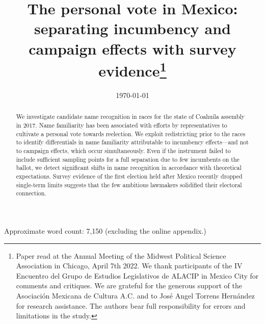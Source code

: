 \documentclass[letter,12pt]{article}
\begin{document}
\title{The personal vote in Mexico: separating incumbency and campaign effects with survey evidence\thanks{Paper read at the Annual Meeting of the Midwest Political Science Association in Chicago, April 7th 2022. We thank participants of the IV Encuentro del Grupo de Estudios Legislativos de ALACIP in Mexico City for comments and critiques. We are grateful for the generous support of the Asociación Mexicana de Cultura A.C. and to José Angel Torrens Hernández for research assistance. The authors bear full responsibility for errors and limitations in the study.}}
\date{\today}
\maketitle


\begin{abstract}
\noindent We investigate candidate name recognition in races for the state of Coahuila assembly in 2017. Name familiarity has been associated with efforts by representatives to cultivate a personal vote towards reelection. We exploit redistricting prior to the races to identify differentials in name familiarity attributable to incumbency effects---and not to campaign effects, which occur simultaneously. Even if the instrument failed to include sufficient sampling points for a full separation due to few incumbents on the ballot, we detect significant shifts in name recognition in accordance with theoretical expectations. Survey evidence of the first election held after Mexico recently dropped single-term limits suggests that the few ambitious lawmakers solidified their electoral connection.
\end{abstract}

\noindent Approximate word count: 7,150 (excluding the online appendix.) 
\end{document}
